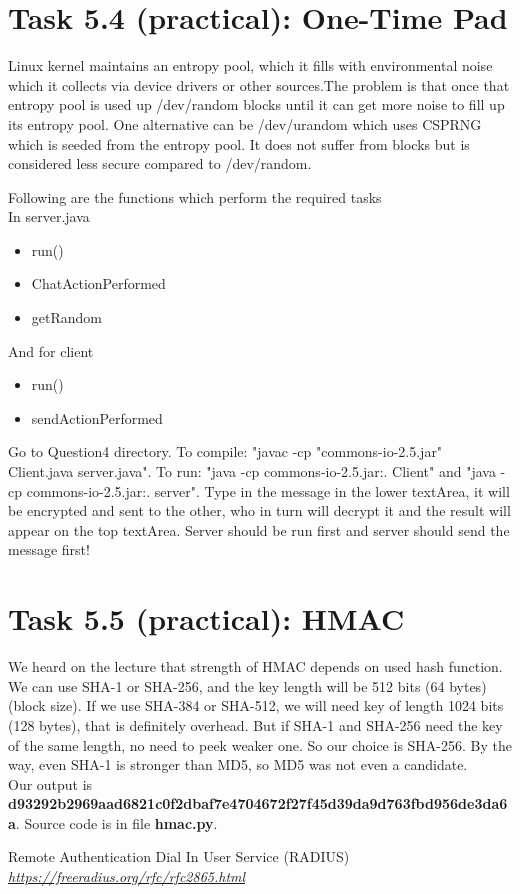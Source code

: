 \documentclass{article}
\begin{document}
\section *{Task 5.4 (practical): One-Time Pad}
Linux kernel maintains an entropy pool, which it fills with environmental noise which it collects via device drivers or other sources.The problem is that once that entropy pool is used up /dev/random blocks until it can get more noise to fill up its entropy pool.
One alternative can be /dev/urandom which uses CSPRNG which is seeded from the entropy pool. It does not suffer from blocks but is considered less secure compared to /dev/random.

Following are the functions which perform the required tasks\\
In server.java
\begin{itemize}
\item run() 
\item ChatActionPerformed 
\item getRandom 
\end{itemize}
And for client
\begin{itemize}
\item run()
\item sendActionPerformed
\end{itemize}

Go to Question4 directory. To compile: "javac -cp "commons-io-2.5.jar" Client.java server.java". To run: "java -cp commons-io-2.5.jar:. Client" and "java -cp commons-io-2.5.jar:. server". Type in the message in the lower textArea, it will be encrypted and sent to the other, who in turn will decrypt it and the result will appear on the top textArea. Server should be run first and server should send the message first!

\section *{Task 5.5 (practical): HMAC}
We heard on the lecture that strength of HMAC depends on used hash function. We can use SHA-1 or SHA-256, and the key length will be 512 bits (64 bytes) (block size). If we use SHA-384 or SHA-512, we will need key of length 1024 bits (128 bytes), that is definitely overhead. But if SHA-1 and SHA-256 need the key of the same length, no need to peek weaker one. So our choice is SHA-256. By the way, even SHA-1 is stronger than MD5, so MD5 was not even a candidate.
\\
Our output is \\
\textbf{d93292b2969aad6821c0f2dbaf7e4704672f27f45d39da9d763fbd956de3da6a}. Source code is in file \textbf{hmac.py}.

\begin{thebibliography}{9}

  Remote Authentication Dial In User Service (RADIUS)
  \emph{\url{https://freeradius.org/rfc/rfc2865.html}}
    
\end{thebibliography}
\end{document}
